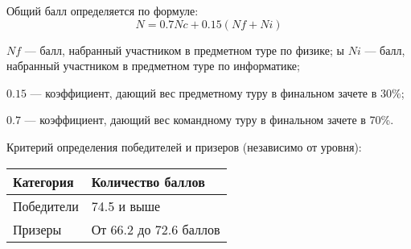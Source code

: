 Общий балл определяется по формуле:
$$N = 0.7Nc +0.15(Nf + Ni)$$

$Nf$ — балл, набранный участником в предметном туре по физике;
ы
$Ni$ — балл, набранный участником в предметном туре по информатике;

$0.15$ — коэффициент, дающий вес предметному туру в финальном зачете в 30\%;

$0.7$ — коэффициент, дающий вес командному туру в финальном зачете в 70\%.

Критерий определения победителей и призеров (независимо от уровня):
\begin{center}
    \begin{tabular}{|l|l|}
        \hline
        Категория&Количество баллов\\
        \hline
        Победители&74.5 и выше\\
        \hline
        Призеры&От 66.2 до 72.6 баллов\\
        \hline
    \end{tabular}
\end{center}
